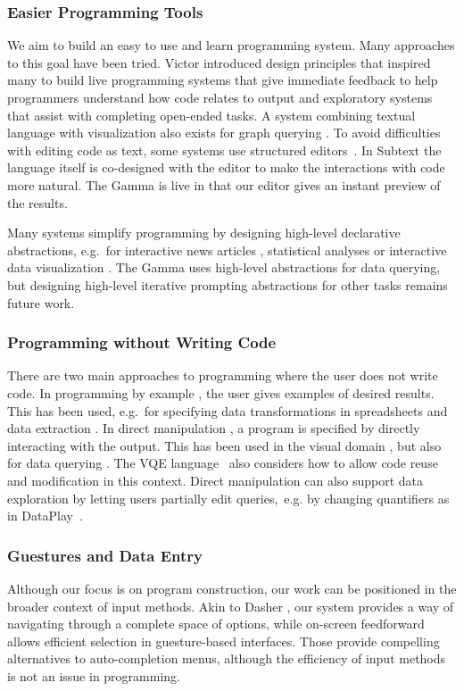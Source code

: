 \documentclass[manuscript,review,anonymous]{acmart}
\begin{document}
\subsubsection*{Easier Programming Tools}
We aim to build an easy to use and learn programming system. Many approaches to this
goal have been tried. Victor \cite{learnable,principle} introduced design principles that
inspired many to build live programming systems \cite{review,liveroad,lighttable} that give
immediate feedback to help programmers understand how code relates to output and
exploratory systems \cite{variolite,exploratory} that assist with completing open-ended tasks.
A system combining textual language with visualization also exists for graph querying \cite{guess}.
To avoid difficulties with editing code as text, some systems use structured editors~\cite{structure-based,livenut,lamdu}.
In Subtext \cite{subtext,directprog} the language itself is co-designed with the editor to make
the interactions with code more natural. The Gamma is live in that our editor gives an instant
preview of the results.

Many systems simplify programming by designing high-level declarative abstractions,
e.g.~for interactive news articles \cite{idyll}, statistical analyses \cite{tea}
or interactive data visualization \cite{interactionviz,vegalite}. The Gamma uses
high-level abstractions for data querying, but designing high-level iterative prompting
abstractions for other tasks remains future work.

\subsubsection*{Programming without Writing Code}
There are two main approaches to programming where
the user does not write code. In programming by example \cite{byexample}, the user gives
examples of desired results. This has been used, e.g.~for specifying data transformations
in spreadsheets and data extraction \cite{spreadsheetpbe,flashextract}.
In direct manipulation \cite{direct}, a program is specified by directly interacting with the
output. This has been used in the visual domain \cite{sketchnsketch}, but also for data querying
\cite{dynamicq,vlang}. The VQE language~\cite{visage} also considers how to allow code reuse and
modification in this context. Direct manipulation can also support data exploration by letting
users partially edit queries,~e.g. by changing quantifiers as in DataPlay~\cite{dataplay}.

\subsubsection*{Guestures and Data Entry}
Although our focus is on program construction, our work can be positioned in the
broader context of input methods. Akin to Dasher \cite{dasher}, our system provides a way of
navigating through a complete space of options, while on-screen feedforward \cite{octopocus} allows
efficient selection in guesture-based interfaces. Those provide compelling alternatives to
auto-completion menus, although the efficiency of input methods is not an issue in programming.
\end{document}

